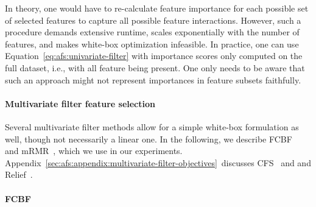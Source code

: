 \documentclass{article}
\theoremstyle{definition}
\begin{document}
In theory, one would have to re-calculate feature importance for each possible set of selected features to capture all possible feature interactions.
However, such a procedure demands extensive runtime, scales exponentially with the number of features, and makes white-box optimization infeasible.
In practice, one can use Equation~\ref{eq:afs:univariate-filter} with importance scores only computed on the full dataset, i.e., with all feature being present.
One only needs to be aware that such an approach might not represent importances in feature subsets faithfully.

\paragraph{Multivariate filter feature selection}

Several multivariate filter methods allow for a simple white-box formulation as well, though not necessarily a linear one.
In the following, we describe FCBF~\cite{yu2003feature} and mRMR~\cite{peng2005feature}, which we use in our experiments.
Appendix~\ref{sec:afs:appendix:multivariate-filter-objectives}~discusses CFS~\cite{hall1999correlation, hall2000correlation} and and Relief~\cite{kira1992feature, robnik1997adaptation}.

\paragraph{FCBF}
\end{document}
